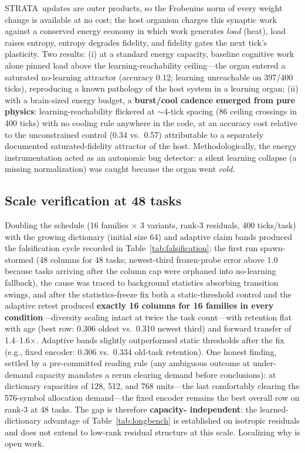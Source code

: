 \documentclass[11pt]{article}
\newcommand{\strata}{STRATA}
\begin{document}
\strata\ updates are outer products, so the Frobenius norm of every weight
change is available at no cost; the host organism charges this synaptic
work against a conserved energy economy in which work generates \emph{load}
(heat), load raises entropy, entropy degrades fidelity, and fidelity gates
the next tick's plasticity. Two results: (i) at a standard energy capacity,
baseline cognitive work alone pinned load above the learning-reachability
ceiling---the organ entered a saturated no-learning attractor (accuracy
0.12; learning unreachable on 397/400 ticks), reproducing a known
pathology of the host system in a learning organ; (ii) with a
brain-sized energy budget, a \textbf{burst/cool cadence emerged from pure
physics}: learning-reachability flickered at $\sim$4-tick spacing (86
ceiling crossings in 400 ticks) with no cooling rule anywhere in the code,
at an accuracy cost relative to the unconstrained control (0.34 vs.\ 0.57)
attributable to a separately documented saturated-fidelity attractor of the
host. Methodologically, the energy instrumentation acted as an autonomic
bug detector: a silent learning collapse (a missing normalization) was
caught because the organ went \emph{cold}.

\subsection{Scale verification at 48 tasks}
\label{sec:scale48}

Doubling the schedule (16 families $\times$ 3 variants, rank-3 residuals,
400 ticks/task) with the growing dictionary (initial size 64) and adaptive
claim bands produced the falsification cycle recorded in
Table~\ref{tab:falsification}: the first run spawn-stormed (48 columns for
48 tasks; newest-third frozen-probe error above 1.0 because tasks arriving
after the column cap were orphaned into no-learning fallback), the cause
was traced to background statistics absorbing transition swings, and after
the statistics-freeze fix both a static-threshold control and the adaptive
retest produced \textbf{exactly 16 columns for 16 families in every
condition}---diversity scaling intact at twice the task count---with
retention flat with age (best row: 0.306 oldest vs.\ 0.310 newest third)
and forward transfer of 1.4--1.6$\times$. Adaptive bands slightly
outperformed static thresholds after the fix (e.g., fixed encoder: 0.306
vs.\ 0.334 old-task retention). One honest finding, settled by a
pre-committed reading rule (any ambiguous outcome at under-demand capacity
mandates a rerun clearing demand before conclusions): at dictionary
capacities of 128, 512, and 768 units---the last comfortably clearing the
576-symbol allocation demand---the fixed encoder remains the best overall
row on rank-3 at 48 tasks. The gap is therefore \textbf{capacity-%
independent}: the learned-dictionary advantage of
Table~\ref{tab:longbench} is established on isotropic residuals and does
not extend to low-rank residual structure at this scale. Localizing why is
open work.
\end{document}
